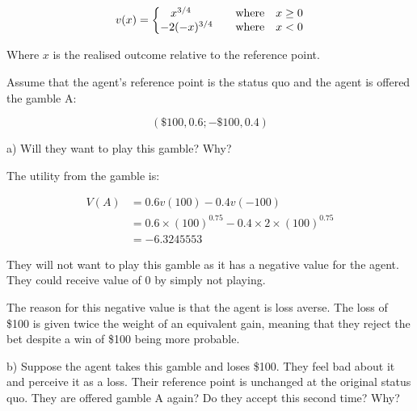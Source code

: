 \documentclass[
  letterpaper,
  DIV=11,
  numbers=noendperiod]{scrreprt}
\begin{document}
\[
v(x)=\left\{\begin{matrix}
x^{3/4} \qquad &\textrm{where} \space &x \geq 0\\
-2(-x)^{3/4} \quad &\textrm{where} \space &x < 0
\end{matrix}\right.
\]

Where \(x\) is the realised outcome relative to the reference point.

Assume that the agent's reference point is the status quo and the agent
is offered the gamble A:

\[(\$100, 0.6; −\$100, 0.4)\]

a) Will they want to play this gamble? Why?

\begin{tcolorbox}[enhanced jigsaw, title=\textcolor{quarto-callout-tip-color}{\faLightbulb}\hspace{0.5em}{Answer}, toprule=.15mm, colback=white, breakable, titlerule=0mm, colframe=quarto-callout-tip-color-frame, coltitle=black, opacityback=0, rightrule=.15mm, colbacktitle=quarto-callout-tip-color!10!white, bottomtitle=1mm, opacitybacktitle=0.6, arc=.35mm, bottomrule=.15mm, toptitle=1mm, leftrule=.75mm, left=2mm]

The utility from the gamble is:

\begin{align*}
V(A)&=0.6v(100)-0.4v(-100) \\
&=0.6\times (100)^{0.75}-0.4\times 2\times (100)^{0.75} \\
&=-6.3245553
\end{align*}

They will not want to play this gamble as it has a negative value for
the agent. They could receive value of 0 by simply not playing.

The reason for this negative value is that the agent is loss averse. The
loss of \$100 is given twice the weight of an equivalent gain, meaning
that they reject the bet despite a win of \$100 being more probable.

\end{tcolorbox}

b) Suppose the agent takes this gamble and loses \$100. They feel bad
about it and perceive it as a loss. Their reference point is unchanged
at the original status quo. They are offered gamble A again? Do they
accept this second time? Why?
\end{document}
